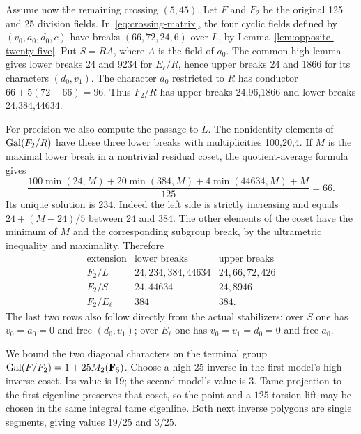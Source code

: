 Assume now the remaining crossing $(5,45)$. Let $F$ and $F_2$ be the original 125 and 25 division fields. In~\eqref{eq:crossing-matrix}, the four cyclic fields defined by $(v_0,a_0,d_0,c)$ have breaks $(66,72,24,6)$ over $L$, by Lemma~\ref{lem:opposite-twenty-five}. Put $S=R A$, where $A$ is the field of $a_0$. The common-high lemma gives lower breaks 24 and 9234 for $E_\ell/R$, hence upper breaks 24 and 1866 for its characters $(d_0,v_1)$. The character $a_0$ restricted to $R$ has conductor $66+5(72-66)=96$. Thus $F_2/R$ has upper breaks 24,96,1866 and lower breaks 24,384,44634.

For precision we also compute the passage to $L$. The nonidentity elements of $\operatorname{Gal}(F_2/R)$ have these three lower breaks with multiplicities 100,20,4. If $M$ is the maximal lower break in a nontrivial residual coset, the quotient-average formula gives
\[
 \frac{100\min(24,M)+20\min(384,M)+4\min(44634,M)+M}{125}=66.
\]
Its unique solution is 234. Indeed the left side is strictly increasing and equals $24+(M-24)/5$ between 24 and 384. The other elements of the coset have the minimum of $M$ and the corresponding subgroup break, by the ultrametric inequality and maximality. Therefore
\begin{equation}\label{eq:crossing-filtrations}
\begin{array}{c|c|c}
 \text{extension}&\text{lower breaks}&\text{upper breaks}\\\hline
 F_2/L&24,234,384,44634&24,66,72,426\\
 F_2/S&24,44634&24,8946\\
 F_2/E_\ell&384&384.
\end{array}
\end{equation}
The last two rows also follow directly from the actual stabilizers: over $S$ one has $v_0=a_0=0$ and free $(d_0,v_1)$; over $E_\ell$ one has $v_0=v_1=d_0=0$ and free $a_0$.

We bound the two diagonal characters on the terminal group $\operatorname{Gal}(F/F_2)=1+25M_2(\mathbf F_5)$. Choose a high 25 inverse in the first model's high inverse coset. Its value is 19; the second model's value is 3. Tame projection to the first eigenline preserves that coset, so the point and a $125$-torsion lift may be chosen in the same integral tame eigenline. Both next inverse polygons are single segments, giving values $19/25$ and $3/25$.

